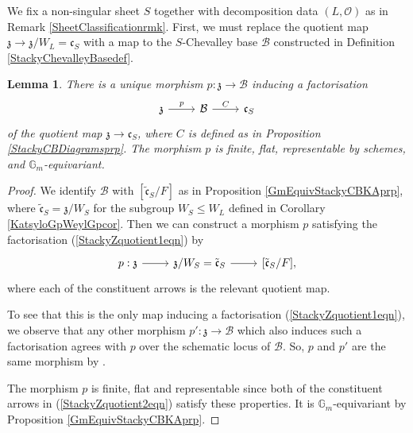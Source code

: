 \documentclass{amsart}
\newtheorem{lemma}[theorem]{Lemma}
\theoremstyle{remark}
\numberwithin{theorem}{section}
\numberwithin{equation}{section}
\begin{document}
We fix a non-singular sheet $S$ together with decomposition data $(L,\mathcal O)$ as in Remark \ref{SheetClassificationrmk}. First, we must replace the quotient map $\mathfrak{z} \rightarrow \mathfrak{z}/W_L = \mathfrak{c}_S$ with a map to the $S$-Chevalley base $\mathcal B$ constructed in Definition \ref{StackyChevalleyBasedef}.

\begin{lemma}\label{StackyZquotientlem}
    There is a unique morphism $p:\mathfrak{z} \rightarrow \mathcal B$ inducing a factorisation
    \begin{equation}\label{StackyZquotient1eqn}
        \begin{tikzcd}
            \mathfrak{z} \arrow[r, "p"] & \mathcal B \arrow[r, "C"] & \mathfrak{c}_S
        \end{tikzcd}
    \end{equation}
    of the quotient map $\mathfrak{z} \rightarrow \mathfrak{c}_S$, where $C$ is defined as in Proposition \ref{StackyCBDiagramsprp}. The morphism $p$ is finite, flat, representable by schemes, and $\mathbb{G}_m$-equivariant.
\end{lemma}

\begin{proof} 
We identify $\mathcal B$ with $[\tilde{\mathfrak{c}}_S/F]$ as in Proposition \ref{GmEquivStackyCBKAprp}, where $\tilde{\mathfrak{c}}_S = \mathfrak{z}/W_S$ for the subgroup $W_S \leq W_L$ defined in Corollary \ref{KatsyloGpWeylGpcor}. Then we can construct a morphism $p$ satisfying the factorisation (\ref{StackyZquotient1eqn}) by
\begin{equation}\label{StackyZquotient2eqn}
        \begin{tikzcd}
            p:\mathfrak{z} \arrow[r] & \mathfrak{z}/W_S = \tilde{\mathfrak{c}}_S \arrow[r] & {[\tilde{\mathfrak{c}}_S/F]},
        \end{tikzcd}
    \end{equation}
where each of the constituent arrows is the relevant quotient map.

To see that this is the only map inducing a factorisation (\ref{StackyZquotient1eqn}), we observe that any other morphism $p':\mathfrak{z} \rightarrow \mathcal B$ which also induces such a factorisation agrees with $p$ over the schematic locus of $\mathcal B$. So, $p$ and $p'$ are the same morphism by \cite[Proposition A.1]{FMN}.

The morphism $p$ is finite, flat and representable since both of the constituent arrows in (\ref{StackyZquotient2eqn}) satisfy these properties. It is $\mathbb{G}_m$-equivariant by Proposition \ref{GmEquivStackyCBKAprp}.
\end{proof}
\end{document}
